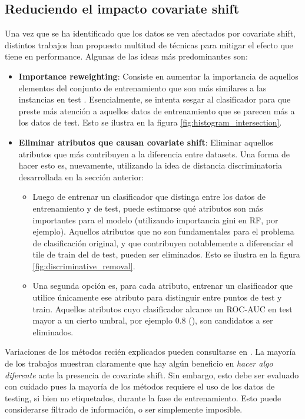 \subsection{Reduciendo el impacto covariate shift}

Una vez que se ha identificado que los datos se ven afectados por covariate shift,  distintos trabajos han propuesto multitud de técnicas para mitigar el efecto que tiene en performance. Algunas de las ideas más predominantes son:

\begin{itemize}
\item \textbf{Importance reweighting}: Consiste en aumentar la importancia de aquellos elementos del conjunto de entrenamiento que son más similares a las instancias en test  \cite{kouw2019introduction} \cite{non-stationary}  \cite{GeetaDharani2019CovariateSA}. Esencialmente, se intenta sesgar al clasificador para que preste más atención a aquellos datos de entrenamiento que se parecen más a los datos de test. Esto se ilustra en la figura \ref{fig:histogram_intersection}.

\item \textbf{Eliminar atributos que causan covariate shift}: Eliminar aquellos atributos que más contribuyen a la diferencia entre datasets. Una forma de hacer esto es, nuevamente, utilizando la idea de distancia discriminatoria desarrollada en la sección anterior:

\begin{itemize}
\item Luego de entrenar un clasificador que distinga entre los datos de entrenamiento y de test, puede estimarse qué atributos son más importantes para el modelo (utilizando importancia gini en RF, por ejemplo). Aquellos atributos que no son fundamentales para el problema de clasificación original, y que contribuyen notablemente a diferenciar el tile de train del de test, pueden ser eliminados. Esto se ilustra en la figura \ref{fig:discriminative_removal}. 
\item Una segunda opción es, para cada atributo, entrenar un clasificador que utilice únicamente ese atributo para distinguir entre puntos de test y train. Aquellos atributos cuyo clasificador alcance un ROC-AUC en test mayor a un cierto umbral, por ejemplo 0.8 (\cite{GeetaDharani2019CovariateSA}), son candidatos a ser eliminados.
\end{itemize}
\end{itemize}

Variaciones de los métodos recién explicados pueden consultarse en \cite{adaptative} \cite{liu2017robust} \cite{10.5555/1314498.1390324}  \cite{adaptative_learning} \cite{kouw2019introduction}. La mayoría de los trabajos muestran claramente que hay algún beneficio en \textit{hacer algo diferente} ante la presencia de covariate shift. Sin embargo, esto debe ser evaluado con cuidado pues la mayoría de los métodos requiere el uso de los datos de testing, si bien no etiquetados, durante la fase de entrenamiento. Esto puede considerarse filtrado de información, o ser simplemente imposible. \\

